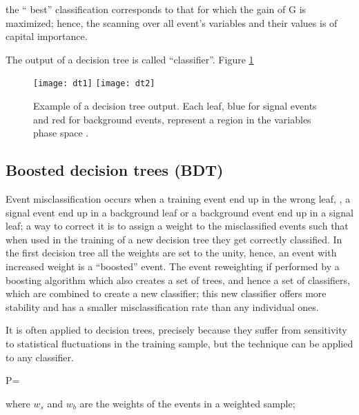 the `` best'' classification corresponds to that for which the gain of G is maximized; hence, the scanning over all event's variables and their values is of capital importance.

The output of a decision tree is called ``classifier''. Figure \ref{fig:dtr}

\begin{figure}[!h]
  \centering
  \texttt{[image: dt1]}
  \texttt{[image: dt2]}
  \caption[Decision tree output example.]{Example of a decision tree output. Each leaf, blue for signal events and red for background events, represent a region in the variables phase space \cite{coadou}.}\label{fig:dtr}
\end{figure}

\subsection{Boosted decision trees (BDT)}

Event misclassification occurs when a training event end up in the wrong leaf, \ie, a signal event end up in a background leaf or a background event end up in a signal leaf; a way to correct it is to assign a weight to the misclassified events such that when used in the training of a new decision tree they get correctly classified. In the first decision tree all the weights are set to the unity, hence, an event with increased weight is a ``boosted'' event. The event reweighting if performed by a boosting algorithm which also creates a set of trees,  and hence a set of classifiers, which are combined to create a new classifier; this new classifier offers more stability and has a smaller misclassification rate than any individual ones.


It is often applied to decision trees, precisely because they suffer from sensitivity to statistical fluctuations in the training sample, but the technique can be applied to any classifier.



 






\beqn
P=
\eeqn

\noindent where $w_s$ and $w_b$ are the weights of the events in a weighted sample;  







